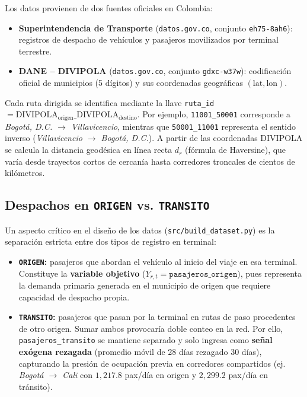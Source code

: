 \documentclass[11pt,a4paper]{article}
\begin{document}
Los datos provienen de dos fuentes oficiales en Colombia:
\begin{itemize}[leftmargin=1.5em]
    \item \textbf{Superintendencia de Transporte} (\texttt{datos.gov.co}, conjunto \texttt{eh75-8ah6}): registros de despacho de vehículos y pasajeros movilizados por terminal terrestre.
    \item \textbf{DANE -- DIVIPOLA} (\texttt{datos.gov.co}, conjunto \texttt{gdxc-w37w}): codificación oficial de municipios (5 dígitos) y sus coordenadas geográficas $(\text{lat}, \text{lon})$.
\end{itemize}

Cada ruta dirigida se identifica mediante la llave \texttt{ruta\_id} $= \text{DIVIPOLA}_{\text{origen}}\_\text{DIVIPOLA}_{\text{destino}}$. Por ejemplo, \texttt{11001\_50001} corresponde a \textit{Bogotá, D.C. $\to$ Villavicencio}, mientras que \texttt{50001\_11001} representa el sentido inverso (\textit{Villavicencio $\to$ Bogotá, D.C.}). A partir de las coordenadas DIVIPOLA se calcula la distancia geodésica en línea recta $d_r$ (fórmula de Haversine), que varía desde trayectos cortos de cercanía hasta corredores troncales de cientos de kilómetros.

\subsection{Despachos en \texttt{ORIGEN} vs. \texttt{TRANSITO}}

Un aspecto crítico en el diseño de los datos (\texttt{src/build\_dataset.py}) es la separación estricta entre dos tipos de registro en terminal:
\begin{itemize}[leftmargin=1.5em]
    \item \textbf{\texttt{ORIGEN}:} pasajeros que abordan el vehículo al inicio del viaje en esa terminal. Constituye la \textbf{variable objetivo} ($Y_{r,t} = \texttt{pasajeros\_origen}$), pues representa la demanda primaria generada en el municipio de origen que requiere capacidad de despacho propia.
    \item \textbf{\texttt{TRANSITO}:} pasajeros que pasan por la terminal en rutas de paso procedentes de otro origen. Sumar ambos provocaría doble conteo en la red. Por ello, \texttt{pasajeros\_transito} se mantiene separado y solo ingresa como \textbf{señal exógena rezagada} (promedio móvil de 28 días rezagado 30 días), capturando la presión de ocupación previa en corredores compartidos (ej. \textit{Bogotá $\to$ Cali} con $1{,}217.8$ pax/día en origen y $2{,}299.2$ pax/día en tránsito).
\end{itemize}
\end{document}
